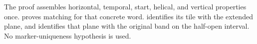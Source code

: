 The proof assembles horizontal, temporal, start, helical, and vertical properties once.  proves matching for that concrete word.  identifies its tile with the extended plane, and  identifies that plane with the original band on the half-open interval. No marker-uniqueness hypothesis is used.
